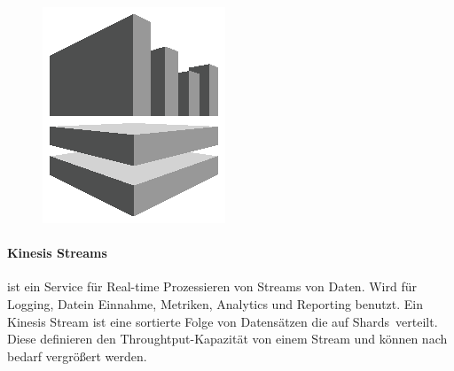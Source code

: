 \documentclass[
12pt,
english,
ngerman,
headsepline,
twoside,
openright,
numbers=noenddot,version=first
]{scrreprt}
\begin{document}
\begin{figure}
	\includegraphics[width=0.9\linewidth]{./pics/aws/Analytics_GRAYSCALE_AmazonKinesis.eps}
\end{figure}
\paragraph{Kinesis Streams} ist ein Service für Real-time Prozessieren von Streams von Daten. Wird für Logging, Datein Einnahme, Metriken, Analytics und Reporting benutzt. Ein Kinesis Stream ist eine sortierte Folge von Datensätzen die auf \glqq Shards\grqq\ verteilt. Diese definieren den Throughtput-Kapazität von einem Stream und können nach bedarf vergrößert werden.
\end{document}
